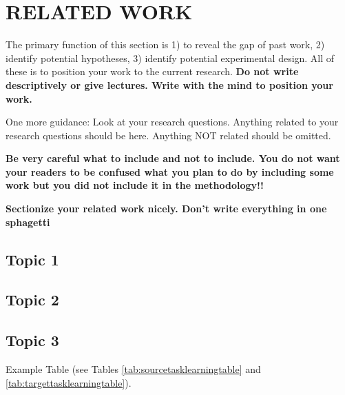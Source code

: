 \setlength{\footskip}{8mm}

\chapter{RELATED WORK}

The primary function of this section is 1) to reveal the gap of past work, 2) identify potential hypotheses, 3) identify potential experimental design.  All of these is to position your work to the current research.  \textbf{Do not write descriptively or give lectures.   Write with the mind to position your work.}

One more guidance:  Look at your research questions.   Anything related to your research questions should be here.   Anything NOT related should be omitted.

\textbf{Be very careful what to include and not to include.  You do not want your readers to be confused what you plan to do by including some work but you did not include it in the methodology!!
}

\textbf{Sectionize your related work nicely.  Don't write everything in one sphagetti}

\section{Topic 1}


\section{Topic 2}


\section{Topic 3}

Example Table (see Tables \ref{tab:sourcetasklearningtable} and \ref{tab:targettasklearningtable}).

